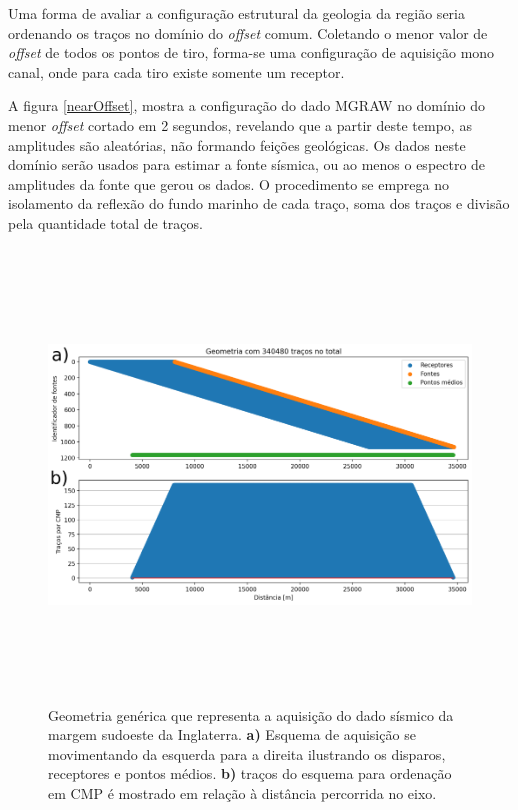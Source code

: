 \documentclass[
	12pt,				%
	openright,			%
	oneside,			%
	a4paper,			%
	english,			%
	brazil				%
	]{abntex2}
\begin{document}
	Uma forma de avaliar a configuração estrutural da geologia da região seria ordenando os traços no domínio do \textit{offset} comum. Coletando o menor valor de \textit{offset} de todos os pontos de tiro, forma-se uma configuração de aquisição mono canal, onde para cada tiro existe somente um receptor. 
	
	A figura \ref{nearOffset}, mostra a configuração do dado MGRAW no domínio do menor \textit{offset} cortado em 2 segundos, revelando que a partir deste tempo, as amplitudes são aleatórias, não formando feições geológicas. Os dados neste domínio serão usados para estimar a fonte sísmica, ou ao menos o espectro de amplitudes da fonte que gerou os dados. O procedimento se emprega no isolamento da reflexão do fundo marinho de cada traço, soma dos traços e divisão pela quantidade total de traços. 

    \begin{figure}[htp!]
		\centering
		\includegraphics[width=15.5cm,height=12cm]{../imagens/cmpTraceCountAll.png}
		\caption{Geometria genérica que representa a aquisição do dado sísmico da margem sudoeste da Inglaterra. \textbf{a)} Esquema de aquisição se movimentando da esquerda para a direita ilustrando os disparos, receptores e pontos médios. \textbf{b)} traços do esquema para ordenação em CMP é mostrado em relação à distância percorrida no eixo.}
		\label{cmpAll}
	\end{figure}
\end{document}
